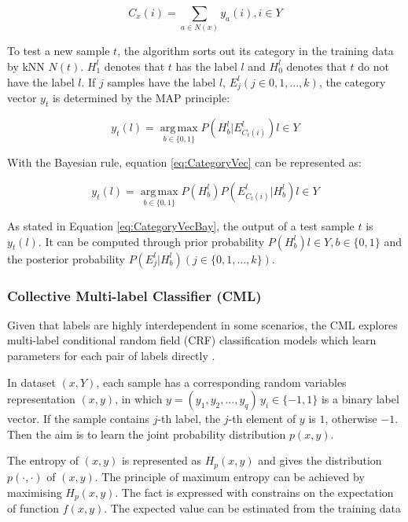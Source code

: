 \begin{equation}\label{eq:KNNCounting}
C_{x}(i) = \sum_{a \in N(x)} y_{a}(i), i \in Y
\end{equation}

To test a new sample $t$, the algorithm sorts out its category in the training data by kNN $N(t)$. $H_{1}^l$ denotes that $t$ has the label $l$ and $H_{0}^l$ denotes that $t$ do not have the label $l$. If $j$ samples have the label $l$, $E_{j}^l (j \in {0,1,...,k})$, the category vector $y_{t}$ is determined by the MAP principle:

\begin{equation}\label{eq:CategoryVec}
y_{t}(l) = \operatorname*{arg\,max}_{b \in \{0,1\}} P(H_{b}^l|E_{C_{t}(i) }^l) l \in Y
\end{equation}

With the Bayesian rule, equation \ref{eq:CategoryVec} can be represented as:

\begin{equation}\label{eq:CategoryVecBay}
y_{t}(l) = \operatorname*{arg\,max}_{b \in \{0,1\}} P(H_{b}^l)P(E_{C_{t}(i) }^l|H_{b}^l) l \in Y
\end{equation}

As stated in Equation \ref{eq:CategoryVecBay}, the output of a test sample $t$ is $y_{t}(l)$. It can be computed through prior probability $P(H_{b}^l) l \in Y, b \in \{0,1\}$ and the posterior probability $P(E_{j}^l|H_{b}^l) (j \in \{0,1,...,k\})$.

\subsubsection{Collective Multi-label Classifier (CML)}

Given that labels are highly interdependent in some scenarios, the CML explores multi-label conditional random field (CRF) classification models which learn  parameters for each pair of labels directly \citep{ghamrawi2005collective}.

In dataset $(x,Y)$, each sample has a corresponding random variables representation $(x,y)$, in which $y = (y_{1},y_{2},...,y_{q})\, y_{i} \in \{-1,1\}$ is a binary label vector. If the sample contains $j$-th label, the $j$-th element of $y$ is $1$, otherwise $-1$. Then the aim is to learn the joint probability distribution $p(x,y)$.

The entropy of $(x,y)$ is represented as $H_{p}(x,y)$ and gives the distribution $p(\cdot,\cdot)$ of $(x,y)$. The principle of maximum entropy can be achieved by maximising $H_{p}(x,y)$. The fact is expressed with constrains on the expectation of function $f(x,y)$. The expected value can be estimated from the training data

